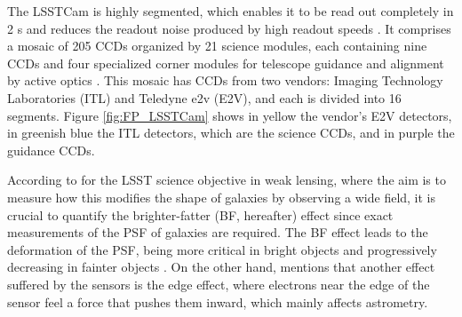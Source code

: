 \vspace{3mm}

The LSSTCam is highly segmented, which enables it to be read out completely in 2 s and reduces the readout noise produced by high readout speeds \citep{2009arXiv0912.0201L}. It comprises a mosaic of 205 CCDs organized by 21 science modules, each containing nine CCDs and four specialized corner modules for telescope guidance and alignment by active optics \citep{snyder2020laboratory}. This mosaic has CCDs from two vendors: Imaging Technology Laboratories (ITL) and Teledyne e2v (E2V), and each is divided into 16 segments. Figure \ref{fig:FP_LSSTCam} shows in yellow the vendor's E2V detectors, in greenish blue the ITL detectors, which are the science CCDs, and in purple the guidance CCDs. 

\vspace{3mm}

According to \cite{walter2015brighter} for the LSST science objective in weak lensing, where the aim is to measure how this modifies the shape of galaxies by observing a wide field, it is crucial to quantify the brighter-fatter (BF, hereafter) effect since exact measurements of the PSF of galaxies are required. The BF effect leads to the deformation of the PSF, being more critical in bright objects and progressively decreasing in fainter objects \citep{lage2017measurements}. On the other hand, \cite{walter2015brighter} mentions that another effect suffered by the sensors is the edge effect, where electrons near the edge of the sensor feel a force that pushes them inward, which mainly affects astrometry.



